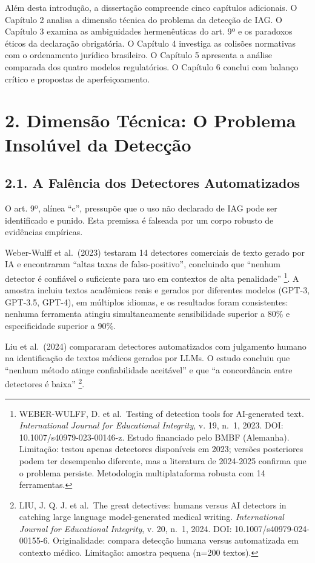 \documentclass[
  12pt,
  a4paper,
  brazil,
  twoside
]{report}
\begin{document}
Além desta introdução, a dissertação compreende cinco capítulos
adicionais. O Capítulo 2 analisa a dimensão técnica do problema da
detecção de IAG. O Capítulo 3 examina as ambiguidades hermenêuticas do
art. 9º e os paradoxos éticos da declaração obrigatória. O Capítulo 4
investiga as colisões normativas com o ordenamento jurídico brasileiro.
O Capítulo 5 apresenta a análise comparada dos quatro modelos
regulatórios. O Capítulo 6 conclui com balanço crítico e propostas de
aperfeiçoamento.

\section{2. Dimensão Técnica: O Problema Insolúvel da
Detecção}\label{dimensuxe3o-tuxe9cnica-o-problema-insoluxfavel-da-detecuxe7uxe3o}

\subsection{2.1. A Falência dos Detectores
Automatizados}\label{a-faluxeancia-dos-detectores-automatizados}

O art. 9º, alínea ``c'', pressupõe que o uso não declarado de IAG pode
ser identificado e punido. Esta premissa é falseada por um corpo robusto
de evidências empíricas.

Weber-Wulff et al.~(2023) testaram 14 detectores comerciais de texto
gerado por IA e encontraram ``altas taxas de falso-positivo'',
concluindo que ``nenhum detector é confiável o suficiente para uso em
contextos de alta penalidade'' \footnote{WEBER-WULFF, D. et al.~Testing
  of detection tools for AI-generated text. \emph{International Journal
  for Educational Integrity}, v. 19, n.~1, 2023. DOI:
  10.1007/s40979-023-00146-z. Estudo financiado pelo BMBF (Alemanha).
  Limitação: testou apenas detectores disponíveis em 2023; versões
  posteriores podem ter desempenho diferente, mas a literatura de
  2024-2025 confirma que o problema persiste. Metodologia
  multiplataforma robusta com 14 ferramentas.}. A amostra incluiu textos
acadêmicos reais e gerados por diferentes modelos (GPT-3, GPT-3.5,
GPT-4), em múltiplos idiomas, e os resultados foram consistentes:
nenhuma ferramenta atingiu simultaneamente sensibilidade superior a 80\%
e especificidade superior a 90\%.

Liu et al.~(2024) compararam detectores automatizados com julgamento
humano na identificação de textos médicos gerados por LLMs. O estudo
concluiu que ``nenhum método atinge confiabilidade aceitável'' e que ``a
concordância entre detectores é baixa'' \footnote{LIU, J. Q. J. et
  al.~The great detectives: humans versus AI detectors in catching large
  language model-generated medical writing. \emph{International Journal
  for Educational Integrity}, v. 20, n.~1, 2024. DOI:
  10.1007/s40979-024-00155-6. Originalidade: compara detecção humana
  versus automatizada em contexto médico. Limitação: amostra pequena
  (n=200 textos).}.
\end{document}
